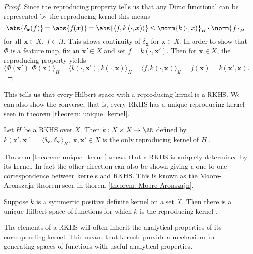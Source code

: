 \begin{proof}
    Since the reproducing property tells us that any Dirac functional can be represented by the reproducing kernel this means
    \[
        \abs{\delta_{\bm{x}} (f)} = \abs{f(\bm{x})} = \abs{\langle f , k \left( \cdot, \bm{x} \right) \rangle} \leq \norm{k \left( \cdot, \bm{x} \right)}_H \cdot \norm{f}_H
    \]
    for all $\bm{x} \in X, \; f \in H$. This shows continuity of $\delta_{\bm{x}}$ for $\bm{x} \in X$. In order to show that $\Phi$ is a feature map, fix an $\bm{x}' \in X$ and set $f = k \left( \cdot, \bm{x}' \right)$. Then for $\bm{x} \in X$, the reproducing property yields
    \[
        \langle \Phi (\bm{x}') , \Phi (\bm{x}) \rangle_H = \langle k \left( \cdot, \bm{x}' \right) , k \left( \cdot, \bm{x} \right) \rangle_H = \langle f , k \left( \cdot, \bm{x} \right) \rangle_H = f(\bm{x}) = k \left( \bm{x}', \bm{x} \right).
    \]
\end{proof}

This tells us that every Hilbert space with a reproducing kernel is a RKHS. We can also show the converse, that is, every RKHS has a unique reproducing kernel seen in theorem \ref{theorem: unique_kernel}.

\begin{thm} \label{theorem: unique_kernel}
    Let $H$ be a RKHS over $X$. Then $k: X \times X \to \RR$ defined by $k \left( \bm{x}', \bm{x} \right) = \langle \delta_{\bm{x}} , \delta_{\bm{x}'} \rangle_H, \; \bm{x} , \bm{x}' \in X$ is the only reproducing kernel of $H$ \cite{SteinwartIngo2008SVMb}.
\end{thm}

Theorem \ref{theorem: unique_kernel} shows that a RKHS is uniquely determined by its kernel. In fact the other direction can also be shown giving a one-to-one correspondence between kernels and RKHS. This is known as the Moore-Aronszajn theorem seen in thorem \ref{theorem: Moore-Aronszajn}.

\begin{thm} \label{theorem: Moore-Aronszajn}
    Suppose $k$ is a symmertic positive definite kernel on a set $X$. Then there is a unique Hilbert space of functions for which $k$ is the reproducing kernel \cite{BerlinetAlain2003RKHS}.
\end{thm}

The elements of a RKHS will often inherit the analytical properties of its corresponding kernel. This means that kernels provide a mechanism for generating spaces of functions with useful analytical properties.